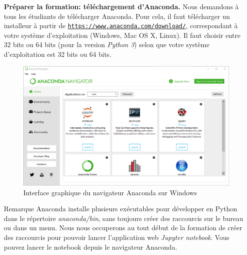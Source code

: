 \documentclass{beamer}
\begin{document}
\begin{frame}

\noindent\textbf{Préparer la formation: téléchargement d’Anaconda.}
Nous demandons à tous les étudiants de télécharger Anaconda. Pour cela, il faut télécharger un installeur à partir de \href{{https://www.anaconda.com/download/}}{\nolinkurl{https://www.anaconda.com/download/}}, correspondant à votre système d’exploitation (Windows, Mac OS X, Linux). Il faut choisir entre 32 bits ou 64 bits (pour la version \emph{Python 3}) selon que votre système d’exploitation est 32 bits ou 64 bits.
\end{frame}

\begin{frame}

\begin{figure}[!ht]  %
  \centerline{\includegraphics[width=0.7\linewidth]{figs/AnacondaNavigator.png}}
  \caption{
  Interface graphique du navigateur Anaconda sur Windows
  }
\end{figure}
\end{frame}

\begin{frame}

\begin{block}{Remarque}
Anaconda installe plusieurs exécutables pour développer en Python dans le répertoire \emph{anaconda/bin}, sans toujours créer des raccourcis sur le bureau ou dans un menu. Nous nous occuperons au tout début de la formation de créer des raccourcis pour pouvoir lancer l'application web \emph{Jupyter notebook}. Vous pouvez lancer le notebook depuis le navigateur Anaconda.
\end{block}
\end{frame}
\end{document}
